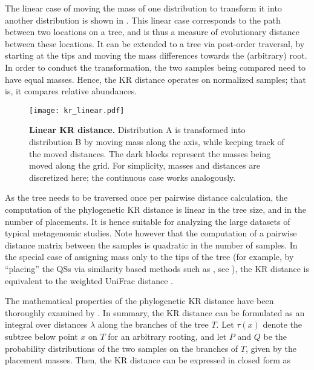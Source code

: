 The linear case of moving the mass of one distribution to transform it into another distribution
is shown in .
This linear case corresponds to the path between two locations on a tree,
and is thus a measure of evolutionary distance between these locations.
It can be extended to a tree via post-order traversal,
by starting at the tips and moving the mass differences towards the (arbitrary) root.
In order to conduct the transformation, the two samples being compared need to have equal masses.
Hence, the KR distance operates on normalized samples; that is, it compares relative abundances.

\begin{figure}[!htb]
    \centering
    \texttt{[image: kr\_linear.pdf]}
    \caption[Linear KR distance]{
        \textbf{Linear KR distance.}
        Distribution A is transformed into distribution B by moving mass along the axis,
        while keeping track of the moved distances.
        The dark blocks represent the masses being moved along the grid.
        For simplicity, masses and distances are discretized here; the continuous case works analogously.
    }
    \label{fig:kr_linear}
\end{figure}

As the tree needs to be traversed once per pairwise distance calculation,
the computation of the phylogenetic KR distance is linear in the tree size, and in the number of placements.
It is hence suitable for analyzing the large datasets of typical metagenomic studies.
Note however that the computation of a pairwise distance matrix between the samples is quadratic in the number of samples.
In the special case of assigning mass only to the tips of the tree
(for example, by ``placing'' the \acp{QS} via similarity based methods such as , see ),
the KR distance is equivalent to the weighted UniFrac distance \cite{Evans2012}.

The mathematical properties of the phylogenetic KR distance
have been thoroughly examined by . %
In summary, the KR distance can be formulated as an integral over distances $\lambda$ along the branches of the tree $T$.
Let $\tau(x)$ denote the subtree below point $x$ on $T$ for an arbitrary rooting,
and let $P$ and $Q$ be the probability distributions of the two samples on the branches of $T$,
given by the placement masses.
Then, the KR distance can be expressed in closed form as

